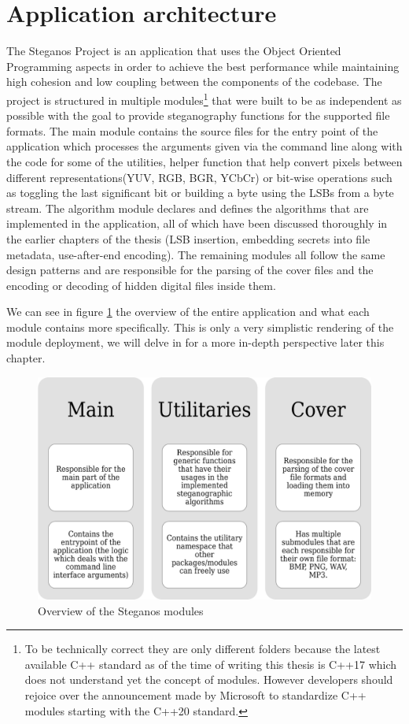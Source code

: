 \section{Application architecture}
The Steganos Project is an application that uses the Object Oriented Programming aspects in order to achieve the best performance while maintaining high cohesion and low coupling between the components of the codebase. The project is structured in multiple modules\footnote{To be technically correct they are only different folders because the latest available C++ standard as of the time of writing this thesis is C++17 which does not understand yet the concept of modules. However developers should rejoice over the announcement made by Microsoft to standardize C++ modules starting with the C++20 standard\cite{N4720}.} that were built to be as independent as possible with the goal to provide steganography functions for the supported file formats. The main module contains the source files for the entry point of the application which processes the arguments given via the command line along with the code for some of the utilities, helper function that help convert pixels between different representations(YUV, RGB, BGR, YCbCr) or bit-wise operations such as toggling the last significant bit or building a byte using the LSBs from a byte stream. The algorithm module declares and defines the algorithms that are implemented in the application, all of which have been discussed thoroughly in the earlier chapters of the thesis (LSB insertion, embedding secrets into file metadata, use-after-end encoding). The remaining modules all follow the same design patterns and are responsible for the parsing of the cover files and the encoding or decoding of hidden digital files inside them. 

We can see in figure \ref{module_overview} the overview of the entire application and what each module contains more specifically. This is only a very simplistic rendering of the module deployment, we will delve in for a more in-depth perspective later this chapter.

\begin{figure}[H]
    \centering
    \includegraphics[width=13cm,keepaspectratio]{pics/application_chapter/module_overview}
    \caption{Overview of the Steganos modules}
    \label{module_overview}
\end{figure}

